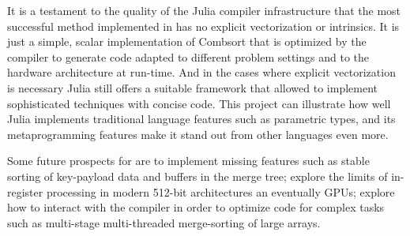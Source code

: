 \documentclass{juliacon}
\begin{document}
It is a testament to the quality of the Julia compiler infrastructure that the most successful method implemented in \chipsort has no explicit vectorization or intrinsics. It is just a simple, scalar implementation of Combsort that is optimized by the compiler to generate code adapted to different problem settings and to the hardware architecture at run-time. And in the cases where explicit vectorization is necessary Julia still offers a suitable framework that allowed \chipsort to implement sophisticated techniques with concise code. This project can illustrate how well Julia implements traditional language features such as parametric types, and its metaprogramming features make it stand out from other languages even more.

Some future prospects for \chipsort are to implement missing features such as stable sorting of key-payload data and buffers in the merge tree; explore the limits of in-register processing in modern 512-bit architectures an eventually GPUs; explore how to interact with the compiler in order to optimize code for complex tasks such as multi-stage multi-threaded merge-sorting of large arrays.





\end{document}
